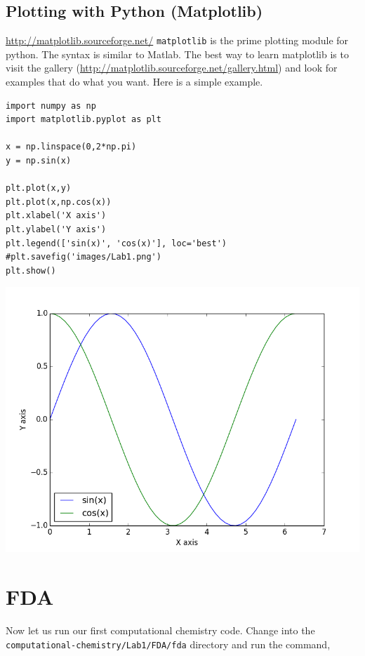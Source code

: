 \documentclass[11pt]{article}
\begin{document}
\subsection{Plotting with Python (Matplotlib)}
\label{sec:org476c351}
\url{http://matplotlib.sourceforge.net/}
\texttt{matplotlib} is the prime plotting module for python. The syntax is similar to Matlab. The best way to learn matplotlib is to visit the gallery (\url{http://matplotlib.sourceforge.net/gallery.html}) and look for examples that do what you want. Here is a simple example.

\begin{verbatim}
import numpy as np
import matplotlib.pyplot as plt

x = np.linspace(0,2*np.pi)
y = np.sin(x)

plt.plot(x,y)
plt.plot(x,np.cos(x))
plt.xlabel('X axis')
plt.ylabel('Y axis')
plt.legend(['sin(x)', 'cos(x)'], loc='best')
#plt.savefig('images/Lab1.png')
plt.show()
\end{verbatim}

\begin{center}
\includegraphics[width=.9\linewidth]{./images/Lab1.png}
\end{center}


\section{FDA}
\label{sec:org4c32db2}

Now let us run our first computational chemistry code. Change into the
\texttt{computational-chemistry/Lab1/FDA/fda} directory and run the command,
\end{document}
